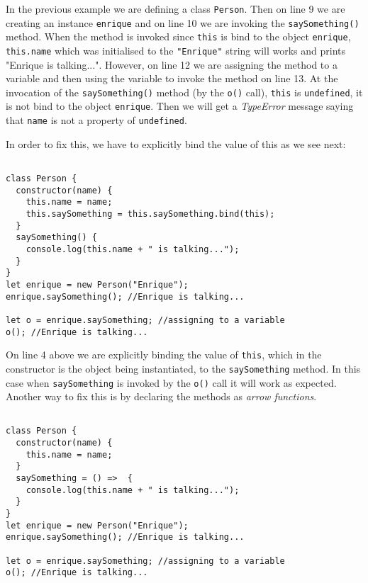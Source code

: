 \documentclass[a4paper, oneside, titlepage, 12pt]{book}
\begin{document}
In the previous example we are defining a class \texttt{Person}. Then on line 9 we are creating an instance \texttt{enrique} and on line 10 we are invoking the \texttt{saySomething()} method. When the method is invoked since \texttt{this} is bind to the object \texttt{enrique}, \texttt{this.name} which was initialised to the \texttt{"Enrique"} string will works and prints "Enrique is talking...". However, on line 12 we are assigning the method to a variable and then using the variable to invoke the method on line 13. At the invocation of the \texttt{saySomething()} method (by the \texttt{o()} call), \texttt{this} is \texttt{undefined}, it is not bind to the object \texttt{enrique}. Then we will get a \textit{TypeError} message saying that \texttt{name} is not a property of \texttt{undefined}. 

In order to fix this, we have to explicitly bind the value of this as we see next:
 
\begin{verbatim}

class Person {
  constructor(name) {
    this.name = name;
    this.saySomething = this.saySomething.bind(this);    
  }
  saySomething() {
    console.log(this.name + " is talking...");
  }
}
let enrique = new Person("Enrique");
enrique.saySomething(); //Enrique is talking...

let o = enrique.saySomething; //assigning to a variable
o(); //Enrique is talking...
\end{verbatim}

On line 4 above we are explicitly binding the value of \texttt{this}, which in the constructor is the object being instantiated, to the \texttt{saySomething} method. In this case when \texttt{saySomething} is invoked by the \texttt{o()} call it will work as expected. Another way to fix this is by declaring the methods as \textit{arrow functions}.

\begin{verbatim}

class Person {
  constructor(name) {
    this.name = name;
  }
  saySomething = () =>  {
    console.log(this.name + " is talking...");
  }
}
let enrique = new Person("Enrique");
enrique.saySomething(); //Enrique is talking...

let o = enrique.saySomething; //assigning to a variable
o(); //Enrique is talking...
\end{verbatim}
\end{document}
